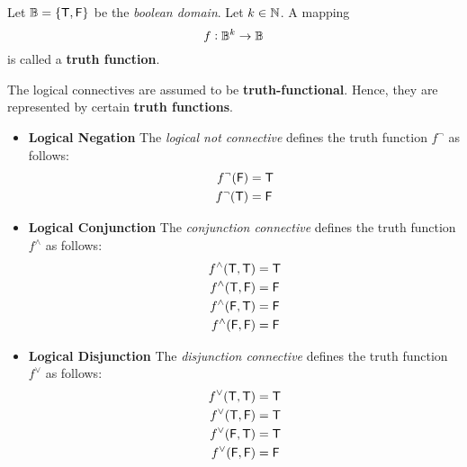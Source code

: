 \begin{tcolorbox}[colframe=defcolor,title={\color{white}\bf Truth Function}]
	\begin{definition}
		Let $\mathbb{B}=\set{\mathsf{T},\mathsf{F}}$ be the \textit{boolean domain}. Let $k\in\mathbb{N}$. A mapping \[
		f:\mathbb{B}^k\to\mathbb{B}
		\] is called a \textbf{truth function}.
	\end{definition}
\end{tcolorbox}
\begin{remark}
	The logical connectives are assumed to be \textbf{truth-functional}.
	Hence, they are represented by certain \textbf{truth functions}.
	\begin{itemize}
		\item[] \textbf{Logical Negation} The \textit{logical not connective} defines the truth function $f^{\lnot}$
		as follows:
		\begin{align*}
			f^{\lnot}(\mathsf{F})&=\mathsf{T}\\
			f^{\lnot}(\mathsf{T})&=\mathsf{F}
		\end{align*}
		\item[] \textbf{Logical Conjunction} The \textit{conjunction connective} defines the truth function $f^{\land}$
		as follows:
		\begin{align*}
			f^{\land}(\mathsf{T},\mathsf{T})&=\mathsf{T}\\
			f^{\land}(\mathsf{T},\mathsf{F})&=\mathsf{F}\\
			f^{\land}(\mathsf{F},\mathsf{T})&=\mathsf{F}\\
			f^{\land}(\mathsf{F},\mathsf{F})&=\mathsf{F}
		\end{align*}
		\item[] \textbf{Logical Disjunction} The \textit{disjunction connective} defines the truth function $f^{\lor}$
		as follows:
		\begin{align*}
			f^{\lor}(\mathsf{T},\mathsf{T})&=\mathsf{T}\\
			f^{\lor}(\mathsf{T},\mathsf{F})&=\mathsf{T}\\
			f^{\lor}(\mathsf{F},\mathsf{T})&=\mathsf{T}\\
			f^{\lor}(\mathsf{F},\mathsf{F})&=\mathsf{F}
		\end{align*}
	\end{itemize}
\end{remark}

